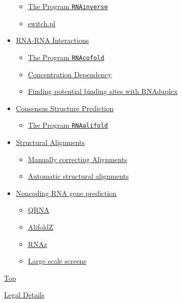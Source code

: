 \documentclass[]{article}
\providecommand{\tightlist}{%
  \setlength{\itemsep}{0pt}\setlength{\parskip}{0pt}}
\begin{document}
\begin{itemize}
  \begin{itemize}
  \tightlist
  \item
    \hyperref[sec5ux5f1]{The Program \texttt{RNAinverse}}
  \item
    \hyperref[sec5ux5f2]{switch.pl}
  \end{itemize}
\item
  \hyperref[sec6]{RNA-RNA Interactions{}}

  \begin{itemize}
  \tightlist
  \item
    \hyperref[sec6ux5f1]{The Program \texttt{RNAcofold}}
  \item
    \hyperref[sec6ux5f2]{Concentration Dependency}
  \item
    \hyperref[sec6ux5f3]{Finding potential binding sites with RNAduplex}
  \end{itemize}
\item
  \hyperref[sec7]{Consensus Structure Prediction{}}

  \begin{itemize}
  \tightlist
  \item
    \hyperref[sec7ux5f1]{The Program \texttt{RNAalifold}}
  \end{itemize}
\item
  \hyperref[sec8]{Structural Alignments{}}

  \begin{itemize}
  \tightlist
  \item
    \hyperref[sec8ux5f1]{Manually correcting Alignments}
  \item
    \hyperref[sec8ux5f2]{Automatic structural alignments}
  \end{itemize}
\item
  \hyperref[sec9]{Noncoding RNA gene prediction{}}

  \begin{itemize}
  \tightlist
  \item
    \hyperref[sec9ux5f1]{QRNA}
  \item
    \hyperref[sec9ux5f2]{AlifoldZ}
  \item
    \hyperref[sec9ux5f3]{RNAz}
  \item
    \hyperref[sec9ux5f4]{Large scale screens}
  \end{itemize}
\end{itemize}

\hyperref[]{Top}

\href{https://www.tbi.univie.ac.at/legal.html}{Legal Details}
\end{document}
